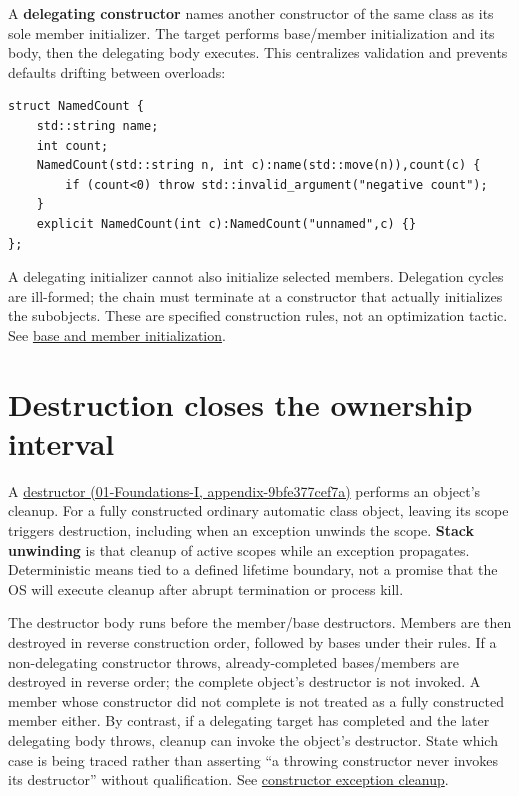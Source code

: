 A \textbf{delegating constructor} names another constructor of the same class as its sole member initializer. The target performs base/member initialization and its body, then the delegating body executes. This centralizes validation and prevents defaults drifting between overloads:

\begin{verbatim}
struct NamedCount {
    std::string name;
    int count;
    NamedCount(std::string n, int c):name(std::move(n)),count(c) {
        if (count<0) throw std::invalid_argument("negative count");
    }
    explicit NamedCount(int c):NamedCount("unnamed",c) {}
};
\end{verbatim}

A delegating initializer cannot also initialize selected members. Delegation cycles are ill-formed; the chain must terminate at a constructor that actually initializes the subobjects. These are specified construction rules, not an optimization tactic. See \href{https://eel.is/c++draft/class.base.init}{base and member initialization}.

\section{Destruction closes the ownership interval}\label{05-engine-i-ch003-destruction-closes-the-ownership-interval}

A \href{../01-Foundations-I/main.pdf\#nameddest=appendix-9bfe377cef7a}{destructor (01-Foundations-I, appendix-9bfe377cef7a)} performs an object's cleanup. For a fully constructed ordinary automatic class object, leaving its scope triggers destruction, including when an exception unwinds the scope. \textbf{Stack unwinding} is that cleanup of active scopes while an exception propagates. Deterministic means tied to a defined lifetime boundary, not a promise that the OS will execute cleanup after abrupt termination or process kill.

The destructor body runs before the member/base destructors. Members are then destroyed in reverse construction order, followed by bases under their rules. If a non-delegating constructor throws, already-completed bases/members are destroyed in reverse order; the complete object's destructor is not invoked. A member whose constructor did not complete is not treated as a fully constructed member either. By contrast, if a delegating target has completed and the later delegating body throws, cleanup can invoke the object's destructor. State which case is being traced rather than asserting ``a throwing constructor never invokes its destructor'' without qualification. See \href{https://eel.is/c++draft/except.ctor}{constructor exception cleanup}.

